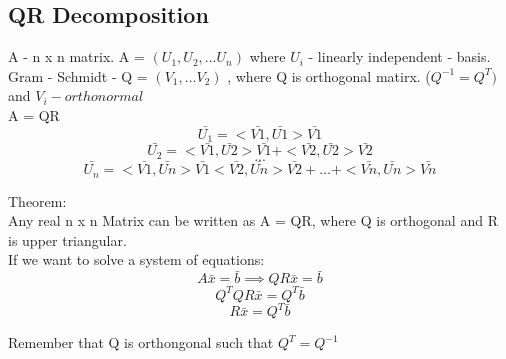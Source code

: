 \documentclass{article}
\begin{document}
\newpage

\subsection*{QR Decomposition}

A - n x n matrix. A = $ (U_1,U_2,...U_n) $ where $U_i$ - linearly independent - basis.\\ 
Gram - Schmidt - Q = $ (V_1,...V_2)$ , where Q is orthogonal matirx. ($ Q^{-1} = Q^T)$ and $V_i -orthonormal$\\

A = QR \\

$$ \bar{U_1} = <\bar{V1}, \bar{U1}>\bar{V1} $$
$$ \bar{U_2} = <\bar{V1}, \bar{U2}>\bar{V1} + <\bar{V2}, \bar{U2}>\bar{V2} $$
$$ ... $$
$$ \bar{U_n} = <\bar{V1}, \bar{Un}>\bar{V1} <\bar{V2}, \bar{Un}>\bar{V2}+\dots  +<\bar{Vn}, \bar{Un}>\bar{Vn}$$

Theorem:\\

Any real n x n Matrix can be written as A = QR, where Q is orthogonal and R is upper triangular.\\

If we want to solve a system of equations:\\
$$ A\bar{x} = \bar{b} \implies QR\bar{x} = \bar{b} $$
$$ Q^T QR \bar {x} = Q^T \bar{b} $$
$$ R\bar{x} = Q^T \bar{b} $$

Remember that Q is orthongonal such that $ Q^T = Q^{-1} $
\end{document}
